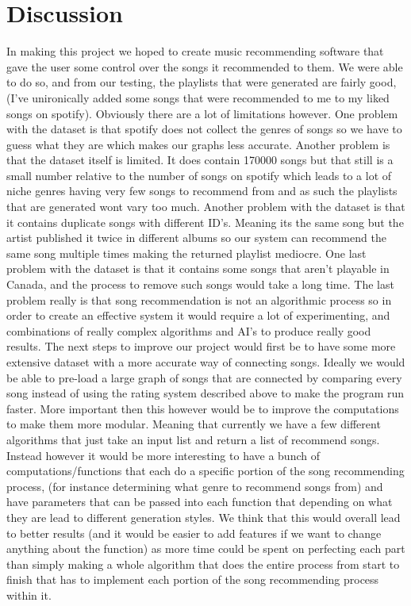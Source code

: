 \documentclass[fontsize=11pt]{article}
\begin{document}
    \section*{Discussion}
    In making this project we hoped to create music recommending software that gave the user some control over the songs it recommended to them. We were able to do so, and from our testing, the playlists that were generated are fairly good, (I've unironically added some songs that were recommended to me to my liked songs on spotify). Obviously there are a lot of limitations however. One problem with the dataset is that spotify does not collect the genres of songs so we have to guess what they are which makes our graphs less accurate. Another problem is that the dataset itself is limited. It does contain 170000 songs but that still is a small number relative to the number of songs on spotify which leads to a lot of niche genres having very few songs to recommend from and as such the playlists that are generated wont vary too much. Another problem with the dataset is that it contains duplicate songs with different ID's. Meaning its the same song but the artist published it twice in different albums so our system can recommend the same song multiple times making the returned playlist mediocre. One last problem with the dataset is that it contains some songs that aren't playable in Canada, and the process to remove such songs would take a long time. The last problem really is that song recommendation is not an algorithmic process so in order to create an effective system it would require a lot of experimenting, and combinations of really complex algorithms and AI's to produce really good results. \vspace{4mm} \newline
    The next steps to improve our project would first be to have some more extensive dataset with a more accurate way of connecting songs. Ideally we would be able to pre-load a large graph of songs that are connected by comparing every song instead of using the rating system described above to make the program run faster. More important then this however would be to improve the computations to make them more modular. Meaning that currently we have a few different algorithms that just take an input list and return a list of recommend songs. Instead however it would be more interesting to have a bunch of computations/functions that each do a specific portion of the song recommending process, (for instance determining what genre to recommend songs from) and have parameters that can be passed into each function that depending on what they are lead to different generation styles. We think that this would overall lead to better results (and it would be easier to add features if we want to change anything about the function) as more time could be spent on perfecting each part than simply making a whole algorithm that does the entire process from start to finish that has to implement each portion of the song recommending process within it. \vspace{4mm} \newline
\end{document}
